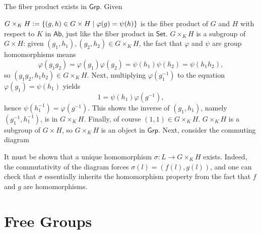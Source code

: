 \documentclass[12pt]{article}
\begin{document}
\subsection{} %
The fiber product exists in $\mathsf{Grp}$. 
Given 
\begin{center}
\end{center}
$G \times_{K} H \vcentcolon= \{(g, h) \in G \times H \mid \varphi(g) = \psi(h)\}$ is the fiber product of $G$ and $H$ with respect to $K$ in $\mathsf{Ab}$, just like the fiber product in $\mathsf{Set}$. 
$G \times_{K} H$ is a subgroup of $G \times H$: 
given $(g_1, h_1), (g_2, h_2) \in G \times_{K} H$, the fact that $\varphi$ and $\psi$ are group homomorphisms means
$$\varphi(g_1 g_2) = \varphi(g_1) \varphi (g_2) = \psi(h_1) \psi(h_2) = \psi(h_1 h_2),$$ 
so $(g_1 g_2, h_1 h_2) \in G \times_{K} H$.  
Next, multiplying $\varphi(g_{1}^{-1})$ to the equation $\varphi(g_1) = \psi(h_1)$ yields 
$$1 = \psi(h_1) \varphi(g^{-1}),$$
hence $\psi(h_{1}^{-1}) = \varphi(g^{-1})$. 
This shows the inverse of $(g_1, h_1)$, namely $(g_{1}^{-1}, h_{1}^{-1})$, is in $G \times_{K} H$.
Finally, of course $(1, 1) \in G \times_{K} H$. 
$G \times_{K} H$ is a subgroup of $G \times H$, so $G \times_{K} H$ is an object in $\mathsf{Grp}$. 
Next, consider the commuting diagram 
\begin{center}
\end{center}
It must be shown that a unique homomorphism $\sigma: L \rightarrow G \times_{K} H$ exists. 
Indeed, the commutativity of the diagram forces $\sigma(l) = (f(l), g(l))$, and one can check that $\sigma$ essentially inherits the homomorphism property from the fact that $f$ and $g$ are homomorphisms. 

\setcounter{section}{4}
\section{Free Groups} 
\setcounter{subsection}{5} 
\end{document}
